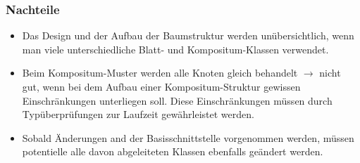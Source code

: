 \documentclass[12pt,a4paper,titlepage]{article}
\theoremstyle{definition}
\begin{document}
\subsubsection{Nachteile}
\begin{itemize}
	\item Das Design und der Aufbau der Baumstruktur werden unübersichtlich, wenn man viele unterschiedliche Blatt- und Kompositum-Klassen verwendet.
	\item Beim Kompositum-Muster werden alle Knoten gleich behandelt $\rightarrow$ nicht gut, wenn bei dem Aufbau einer Kompositum-Struktur gewissen
	Einschränkungen unterliegen soll. Diese Einschränkungen müssen durch Typüberprüfungen zur Laufzeit gewährleistet werden.
	\item Sobald Änderungen and der Basisschnittstelle vorgenommen werden, müssen potentielle alle davon abgeleiteten Klassen ebenfalls geändert werden.
\end{itemize}
\end{document}
